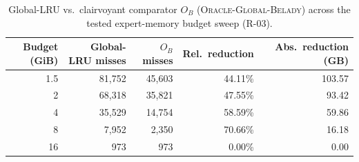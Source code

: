 \begin{table}[t]
\centering
\caption{Global-LRU vs.\ clairvoyant comparator $O_B$ (\textsc{Oracle-Global-Belady}) across the tested expert-memory budget sweep (R-03).}
\label{tab:r2-03-sweep}
\footnotesize
\setlength{\tabcolsep}{4pt}
\begin{tabular}{@{}rrrrr@{}}
\toprule
Budget (GiB) & Global-LRU misses & $O_B$ misses & Rel.\ reduction & Abs.\ reduction (GB) \\
\midrule
1.5 & 81,752 & 45,603 & 44.11\% & 103.57 \\
2 & 68,318 & 35,821 & 47.55\% & 93.42 \\
4 & 35,529 & 14,754 & 58.59\% & 59.86 \\
8 & 7,952 & 2,350 & 70.66\% & 16.18 \\
16 & 973 & 973 & 0.00\% & 0.00 \\
\bottomrule
\end{tabular}
\end{table}

